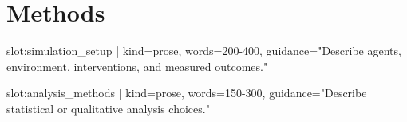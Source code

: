 \section{Methods}

{{slot:simulation_setup | kind=prose, words=200-400, guidance="Describe agents, environment, interventions, and measured outcomes."}}

{{slot:analysis_methods | kind=prose, words=150-300, guidance="Describe statistical or qualitative analysis choices."}}
